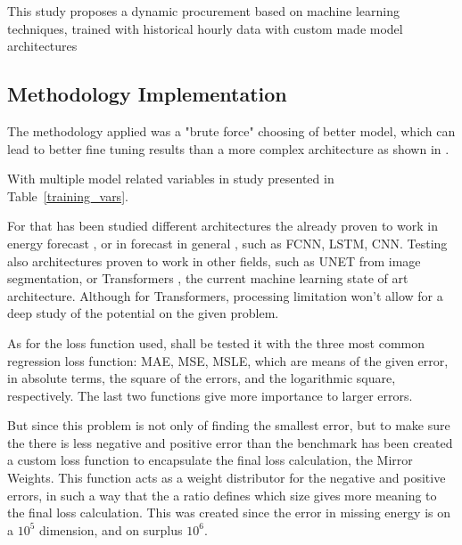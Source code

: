 

This study proposes a dynamic procurement based on machine learning techniques, trained with historical hourly data with custom made model architectures

\subsection{Methodology Implementation}

The methodology applied was a "brute force" choosing of better model, which can lead to better fine tuning results than a more complex architecture as shown in \cite{Liu2022}.\par
With multiple model related variables in study presented in Table~\ref{training_vars}.\par

For that has been studied different architectures the already proven to work in energy forecast \cite{Costa2022}, or in forecast in general \cite{Hewamalage2021}, such as \gls{FCNN}, \gls{LSTM}, \gls{CNN}. Testing also architectures proven to work in other fields, such as UNET \cite{Shelhamer2014} from image segmentation, or Transformers \cite{Vaswani2017}, the current machine learning state of art architecture. Although for Transformers, processing limitation won't allow for a deep study of the potential on the given problem.\par

As for the loss function used, shall be tested it with the three most common regression loss function: \gls{MAE}, \gls{MSE}, \gls{MSLE}, which are means of the given error, in absolute terms, the square of the errors, and the logarithmic square, respectively. The last two functions give more importance to larger errors.\par



But since this problem is not only of finding the smallest error, but to make sure the there is less negative and positive error than the benchmark has been created a custom loss function to encapsulate the final loss calculation, the Mirror Weights. %
This function acts as a weight distributor for the negative and positive errors, in such a way that the a ratio defines which size gives more meaning to the final loss calculation. This was created since the error in missing energy is on a $10^{5}$ dimension, and on surplus $10^{6}$.

